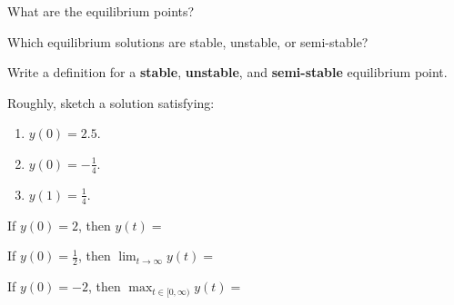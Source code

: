 \begin{parts}
	\item What are the equilibrium points?
	\item Which equilibrium solutions are stable, unstable, or semi-stable?
	\item Write a definition for a \textbf{stable}, \textbf{unstable}, and \textbf{semi-stable} equilibrium point.
	\item Roughly, sketch a solution satisfying:
	\begin{enumerate}
		\item $y(0)=2.5$.
		\item $y(0)=-\frac14$.
		\item $y(1)=\frac14$.
	\end{enumerate}
	\item If $y(0) = 2$, then $y(t) = $
	\item If $y(0) = \frac12$, then $\displaystyle \lim_{t\to \infty} y(t) = $
	\item If $y(0) = -2$, then $\displaystyle \max_{t \in [0,\infty)} y(t) = $
\end{parts}


\bookonlynewpage


\hfill


\bookonlynewpage








